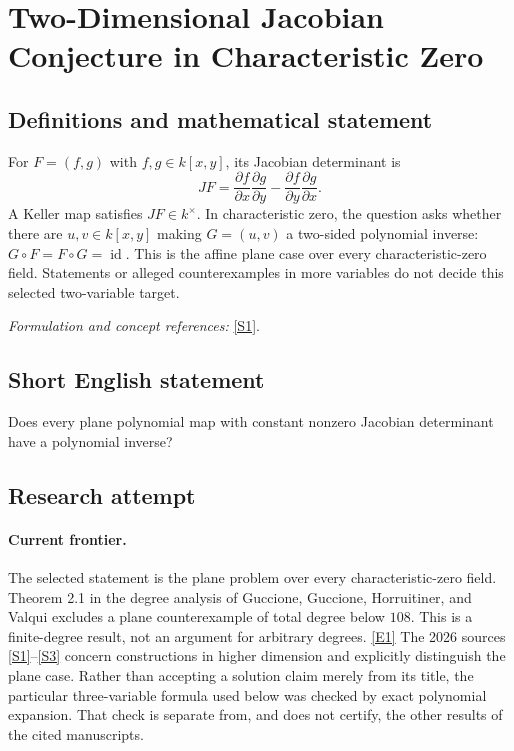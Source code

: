 \documentclass[11pt]{article}
\newcommand{\sref}[2]{\hyperlink{source:#1:#2}{[S#2]}}
\newcommand{\eref}[2]{\hyperlink{extra:#1:#2}{[E#2]}}
\newif\ifshowcatalogue
\newcommand{\cataloguescope}[1]{\ifshowcatalogue
 \paragraph{Exact scope in the supplied catalogue.}
 \begin{quote}\small #1\end{quote}\fi}
\begin{document}
\setcounter{section}{102}
\clearpage
\section{\texorpdfstring{Two-Dimensional Jacobian Conjecture in Characteristic Zero}{Two-Dimensional Jacobian Conjecture in Characteristic Zero}}\label{103}
\subsection{Definitions and mathematical statement}
For $F=(f,g)$ with $f,g\in k[x,y]$, its Jacobian determinant is
\[
 JF=\frac{\partial f}{\partial x}\frac{\partial g}{\partial y}
       -\frac{\partial f}{\partial y}\frac{\partial g}{\partial x}.
\]
A Keller map satisfies $JF\in k^\times$. In characteristic zero, the question asks whether there are $u,v\in k[x,y]$ making $G=(u,v)$ a two-sided polynomial inverse: $G\circ F=F\circ G=\operatorname{id}$. This is the affine plane case over every characteristic-zero field. Statements or alleged counterexamples in more variables do not decide this selected two-variable target.
\par\smallskip\textit{Formulation and concept references:} \sref{103}{1}.
\cataloguescope{Let k be a field of characteristic zero and let F:k\textasciicircum{}2 -> k\textasciicircum{}2 be a polynomial map whose Jacobian determinant is a nonzero constant. Determine whether F must have a polynomial inverse, equivalently whether every two-variable Keller map is a polynomial automorphism of the affine plane.}
\subsection{Short English statement}
Does every plane polynomial map with constant nonzero Jacobian determinant have a polynomial inverse?
\subsection{Research attempt}

\paragraph{Current frontier.}
The selected statement is the plane problem over every characteristic-zero
field. Theorem 2.1 in the degree analysis of Guccione, Guccione, Horruitiner,
and Valqui excludes a plane counterexample of total degree below $108$.
This is a finite-degree result, not an argument for arbitrary degrees.
\eref{103}{1}
The 2026 sources \sref{103}{1}--\sref{103}{3} concern constructions in
higher dimension and explicitly distinguish the plane case. Rather than
accepting a solution claim merely from its title, the particular
three-variable formula used below was checked by exact polynomial expansion.
That check is separate from, and does not certify, the other results of the
cited manuscripts.
\end{document}
